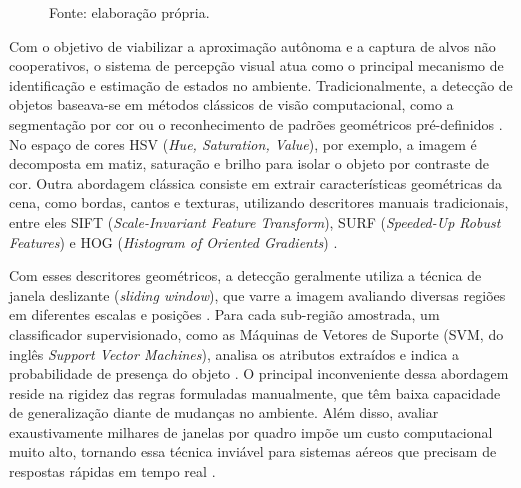\begin{figure}[H]
	
	\vspace{0.2cm}
	
	\begin{flushleft}
		\footnotesize Fonte: elaboração própria.
	\end{flushleft}
	
\end{figure}


Com o objetivo de viabilizar a aproximação autônoma e a captura de alvos não cooperativos, o sistema de percepção visual atua como o principal mecanismo de identificação e estimação de estados no ambiente. Tradicionalmente, a detecção de objetos baseava-se em métodos clássicos de visão computacional, como a segmentação por cor ou o reconhecimento de padrões geométricos pré-definidos \cite{zhao2019}. No espaço de cores HSV (\textit{Hue, Saturation, Value}), por exemplo, a imagem é decomposta em matiz, saturação e brilho para isolar o objeto por contraste de cor. Outra abordagem clássica consiste em extrair características geométricas da cena, como bordas, cantos e texturas, utilizando descritores manuais tradicionais, entre eles SIFT (\textit{Scale-Invariant Feature Transform}), SURF (\textit{Speeded-Up Robust Features}) e HOG (\textit{Histogram of Oriented Gradients}) \cite{amjoud2023, zhao2019}.

Com esses descritores geométricos, a detecção geralmente utiliza a técnica de janela deslizante (\textit{sliding window}), que varre a imagem avaliando diversas regiões em diferentes escalas e posições \cite{amjoud2023, zhao2019}. Para cada sub-região amostrada, um classificador supervisionado, como as Máquinas de Vetores de Suporte (SVM, do inglês \textit{Support Vector Machines}), analisa os atributos extraídos e indica a probabilidade de presença do objeto \cite{amjoud2023, zhao2019}. O principal inconveniente dessa abordagem reside na rigidez das regras formuladas manualmente, que têm baixa capacidade de generalização diante de mudanças no ambiente. Além disso, avaliar exaustivamente milhares de janelas por quadro impõe um custo computacional muito alto, tornando essa técnica inviável para sistemas aéreos que precisam de respostas rápidas em tempo real \cite{zhao2019}.

